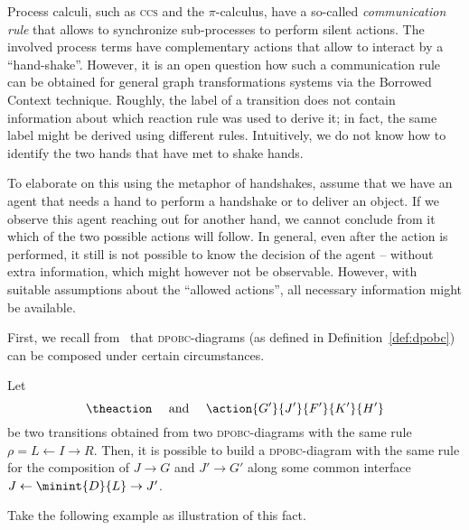 







Process calculi, such as \textsc{ccs} and the $\pi$-calculus, 
have a so-called \emph{communication rule} that allows to synchronize sub-processes to
perform silent actions.
The involved process terms have complementary actions that allow to
interact 
by a ``hand-shake''.
However, it is an open question how such a communication rule can be
obtained for general graph transformations systems
via the Borrowed Context technique.
Roughly, 
the label of a transition does not contain information about which
reaction rule was used to derive it;
in fact, 
the same label might be derived using different rules. 
Intuitively, 
we do not know how to identify the  two hands that have met to shake hands.


To elaborate on this using the  metaphor of handshakes, 
assume that we have an agent that needs a hand to perform a
handshake 
or to deliver an object. 
If we observe this agent reaching out for another hand, 
we cannot conclude from it which of the two possible actions will follow. 
In general, 
even after the action is performed,
it still is not possible to know the decision of the agent --
without extra information, which might however not be observable. 
However, 
with suitable assumptions about the ``allowed actions'',
all necessary information might be available. 







First, we recall from~\cite{BEK06} 
that  \textsc{dpobc}-diagrams (as defined in Definition~\ref{def:dpobc}) can be composed under certain circumstances. 
\begin{fact}
  Let \[\theaction \quad\text{ and }\quad \action{G'}{J'}{F'}{K'}{H'} \] 
  be two transitions obtained from two \textsc{dpobc}-diagrams
  with the same rule $\rho = L \leftarrow I \rightarrow R$.
Then, it is possible to build a \textsc{dpobc}-diagram with the same rule for the composition of $J \rightarrow G$ and $J' \rightarrow G'$ along some common interface $J \gets \minint{D}{L} \to J'$. 
\end{fact}

Take the following example as illustration of this fact. 

